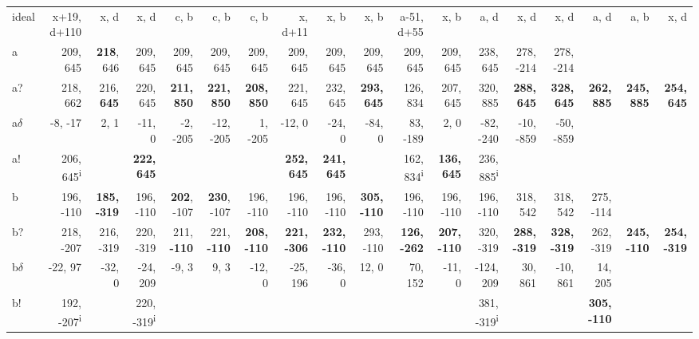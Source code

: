 \begin{table}[p]
{\begin{tabular}{lrrrrrrrrrrrrrrrrr}
ideal & x+19, d+110 & x, d & x, d & c, b & c, b & c, b & x, d+11 & x, b & x, b & a-51, d+55 & x, b & a, d & x, d & x, d & a, d & a, b & x, d \\
a & 209, 645 & \textbf{218}, 646 & 209, 645 & 209, 645 & 209, 645 & 209, 645 & 209, 645 & 209, 645 & 209, 645 & 209, 645 & 209, 645 & 238, 645 & 278, -214 & 278, -214 &  &  &  \\
a? & 218, 662 & 216, \textbf{645} & 220, 645 & \textbf{211, 850} & \textbf{221, 850} & \textbf{208, 850} & 221, 645 & 232, 645 & \textbf{293, 645} & 126, 834 & 207, 645 & 320, 885 & \textbf{288, 645} & \textbf{328, 645} & \textbf{262, 885} & \textbf{245, 885} & \textbf{254, 645} \\
a$\delta$ & -8, -17 & 2, 1 & -11, 0 & -2, -205 & -12, -205 & 1, -205 & -12, 0 & -24, 0 & -84, 0 & 83, -189 & 2, 0 & -82, -240 & -10, -859 & -50, -859 &  &  &  \\
a! & 206, 645\textsuperscript{i} &  & \textbf{222, 645} &  &  &  & \textbf{252, 645} & \textbf{241, 645} &  & 162, 834\textsuperscript{i} & \textbf{136, 645} & 236, 885\textsuperscript{i} &  &  &  &  &  \\
b & 196, -110 & \textbf{185, -319} & 196, -110 & \textbf{202}, -107 & \textbf{230}, -107 & 196, -110 & 196, -110 & 196, -110 & \textbf{305, -110} & 196, -110 & 196, -110 & 196, -110 & 318, 542 & 318, 542 & 275, -114 &  &  \\
b? & 218, -207 & 216, -319 & 220, -319 & 211, \textbf{-110} & 221, \textbf{-110} & \textbf{208, -110} & \textbf{221, -306} & \textbf{232, -110} & 293, -110 & \textbf{126, -262} & \textbf{207, -110} & 320, -319 & \textbf{288, -319} & \textbf{328, -319} & 262, -319 & \textbf{245, -110} & \textbf{254, -319} \\
b$\delta$ & -22, 97 & -32, 0 & -24, 209 & -9, 3 & 9, 3 & -12, 0 & -25, 196 & -36, 0 & 12, 0 & 70, 152 & -11, 0 & -124, 209 & 30, 861 & -10, 861 & 14, 205 &  &  \\
b! & 192, -207\textsuperscript{i} &  & 220, -319\textsuperscript{i} &  &  &  &  &  &  &  &  & 381, -319\textsuperscript{i} &  &  & \textbf{305, -110} &  &  \\

\end{tabular}}
\end{table}
